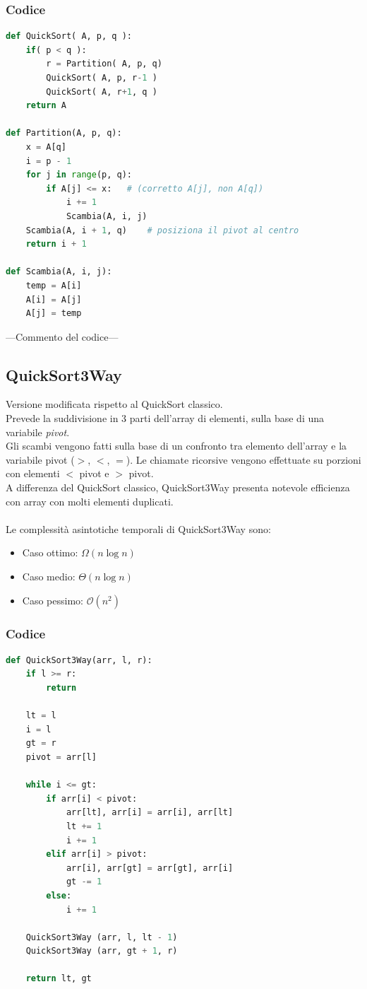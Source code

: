 \documentclass[a4paper, 11pt]{article}
\begin{document}
\subsubsection{Codice}
\begin{lstlisting}[style=mycodestyle, language=Python]
def QuickSort( A, p, q ):
    if( p < q ):
        r = Partition( A, p, q)
        QuickSort( A, p, r-1 )
        QuickSort( A, r+1, q )
    return A

def Partition(A, p, q):
    x = A[q]
    i = p - 1
    for j in range(p, q):
        if A[j] <= x:   # (corretto A[j], non A[q])
            i += 1
            Scambia(A, i, j)
    Scambia(A, i + 1, q)    # posiziona il pivot al centro
    return i + 1

def Scambia(A, i, j):
    temp = A[i]
    A[i] = A[j]
    A[j] = temp
\end{lstlisting}
---Commento del codice---

\subsection{QuickSort3Way}
Versione modificata rispetto al QuickSort classico.\\
Prevede la suddivisione in 3 parti dell'array di elementi, sulla base di una variabile \textit{pivot}.\\
Gli scambi vengono fatti sulla base di un confronto tra elemento dell'array e la variabile pivot ($>$, $<$, $=$). Le chiamate ricorsive vengono effettuate su porzioni con elementi $<$ pivot e $>$ pivot.\\
A differenza del QuickSort classico, QuickSort3Way presenta notevole efficienza con array con molti elementi duplicati.\\\\
Le complessità asintotiche temporali di QuickSort3Way sono:
\begin{itemize}
    \item Caso ottimo: $\Omega(n\log n)$
    \item Caso medio: $\Theta(n\log n)$
    \item Caso pessimo: $\mathcal{O}(n^2)$
\end{itemize}

\subsubsection{Codice}
\begin{lstlisting}[style=mycodestyle, language=Python]
    def QuickSort3Way(arr, l, r):
    if l >= r:
        return

    lt = l
    i = l
    gt = r
    pivot = arr[l]

    while i <= gt:
        if arr[i] < pivot:
            arr[lt], arr[i] = arr[i], arr[lt]
            lt += 1
            i += 1
        elif arr[i] > pivot:
            arr[i], arr[gt] = arr[gt], arr[i]
            gt -= 1
        else:
            i += 1

    QuickSort3Way (arr, l, lt - 1)
    QuickSort3Way (arr, gt + 1, r)

    return lt, gt
\end{lstlisting}
\end{document}
